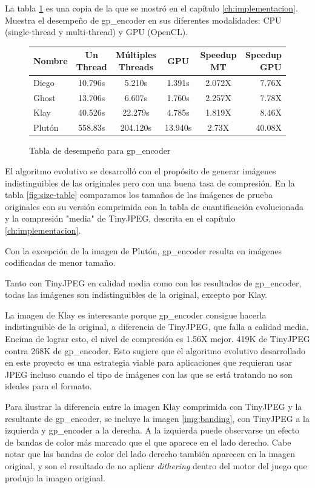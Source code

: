 La tabla \ref{fig:perf_table} es una copia de la que se mostró en el capítulo
\ref{ch:implementacion}. Muestra el desempeño de gp\_encoder en sus
diferentes modalidades: CPU (single-thread y multi-thread) y GPU (OpenCL).

\begin{figure}[h!]
    \begin{tabular}{ |l c c c c r| }
        \hline
        Nombre &  Un Thread & Múltiples Threads & GPU & Speedup MT & Speedup GPU \\
        \hline
        Diego & 10.796s & 5.210s & 1.391s  & 2.072X & 7.76X \\
        Ghost & 13.706s & 6.607s & 1.760s  & 2.257X & 7.78X \\
        Klay & 40.526s & 22.279s & 4.785s  & 1.819X & 8.46X \\%
        Plutón & 558.83s & 204.120s & 13.940s & 2.73X & 40.08X \\ %
        \hline
    \end{tabular}
    \caption{Tabla de desempeño para gp\_encoder}
    \label{fig:perf_table}
\end{figure}

El algoritmo evolutivo se desarrolló con el propósito de generar imágenes
indistinguibles de las originales pero con una buena tasa de compresión. En la
tabla \ref{fig:size-table} comparamos los tamaños de las imágenes de prueba
originales con su versión comprimida con la tabla de cuantificación
evolucionada y la compresión "media" de TinyJPEG, descrita en el capítulo
\ref{ch:implementacion}.

Con la excepción de la imagen de Plutón, gp\_encoder resulta en imágenes codificadas de menor tamaño.

Tanto con TinyJPEG en calidad media como con los resultados de gp\_encoder, todas las imágenes son indistinguibles de la original, excepto por Klay.

La imagen de Klay es interesante porque gp\_encoder consigue hacerla
indistinguible de la original, a diferencia de TinyJPEG, que falla a calidad
media. Encima de lograr esto, el nivel de compresión es 1.56X mejor. 419K de
TinyJPEG contra 268K de gp\_encoder. Esto sugiere que el algoritmo evolutivo
desarrollado en este proyecto es una estrategia viable para aplicaciones que
requieran usar JPEG incluso cuando el tipo de imágenes con las que se está
tratando no son ideales para el formato.

Para ilustrar la diferencia entre la imagen Klay comprimida con TinyJPEG y la
resultante de gp\_encoder, se incluye la imagen \ref{img:banding}, con TinyJPEG
a la izquierda y gp\_encoder a la derecha. A la izquierda puede observarse un
efecto de bandas de color más marcado que el que aparece en el lado derecho.
Cabe notar que las bandas de color del lado derecho también aparecen en la
imagen original, y son el resultado de no aplicar \emph{dithering} dentro del
motor del juego que produjo la imagen original.


